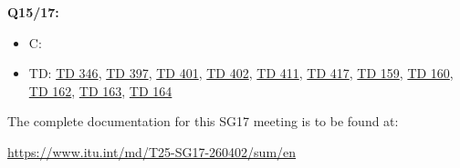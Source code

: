 \textbf{Q15/17:}

\begin{itemize}
  \item C: 
  \item TD: \href{https://www.itu.int/md/meetingdoc.asp?lang=en\&parent=T25-SG17-260402-TD-GEN-0346}{TD 346}, \href{https://www.itu.int/md/meetingdoc.asp?lang=en\&parent=T25-SG17-260402-TD-GEN-0397}{TD 397}, \href{https://www.itu.int/md/meetingdoc.asp?lang=en\&parent=T25-SG17-260402-TD-GEN-0401}{TD 401}, \href{https://www.itu.int/md/meetingdoc.asp?lang=en\&parent=T25-SG17-260402-TD-GEN-0402}{TD 402}, \href{https://www.itu.int/md/meetingdoc.asp?lang=en\&parent=T25-SG17-260402-TD-GEN-0411}{TD 411}, \href{https://www.itu.int/md/meetingdoc.asp?lang=en\&parent=T25-SG17-260402-TD-GEN-0417}{TD 417}, \href{https://www.itu.int/md/meetingdoc.asp?lang=en\&parent=T25-SG17-260402-TD-WP1-0159}{TD 159}, \href{https://www.itu.int/md/meetingdoc.asp?lang=en\&parent=T25-SG17-260402-TD-WP1-0160}{TD 160}, \href{https://www.itu.int/md/meetingdoc.asp?lang=en\&parent=T25-SG17-260402-TD-WP1-0162}{TD 162}, \href{https://www.itu.int/md/meetingdoc.asp?lang=en\&parent=T25-SG17-260402-TD-WP1-0163}{TD 163}, \href{https://www.itu.int/md/meetingdoc.asp?lang=en\&parent=T25-SG17-260402-TD-WP1-0164}{TD 164}
\end{itemize}

The complete documentation for this SG17 meeting is to be found at:

\href{https://www.itu.int/md/T25-SG17-260402/sum/en}{https://www.itu.int/md/T25-SG17-260402/sum/en}
